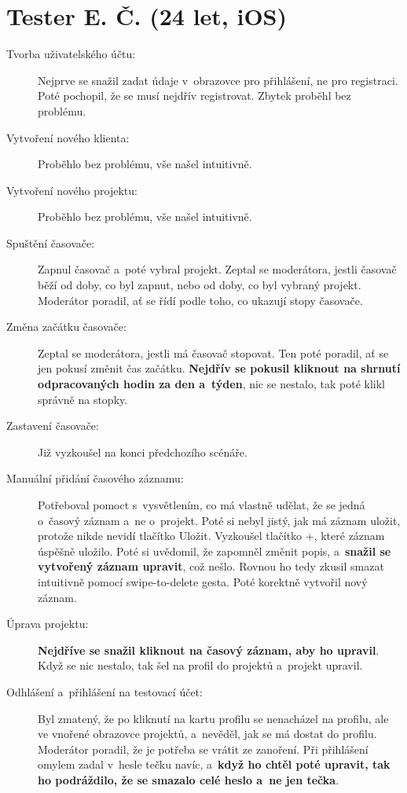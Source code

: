 \section*{Tester E. Č. (24 let, iOS)}

\begin{description}
\item[Tvorba uživatelského účtu:] Nejprve se snažil zadat údaje v~obrazovce pro přihlášení, ne pro registraci. Poté pochopil, že se musí nejdřív registrovat. Zbytek proběhl bez problému.
\item[Vytvoření nového klienta:] Proběhlo bez problému, vše našel intuitivně.
\item[Vytvoření nového projektu:] Proběhlo bez problému, vše našel intuitivně.
\item[Spuštění časovače:] Zapnul časovač a~poté vybral projekt. Zeptal se moderátora, jestli časovač běží od doby, co byl zapnut, nebo od doby, co byl vybraný projekt. Moderátor poradil, ať se řídí podle toho, co ukazují stopy časovače.
\item[Změna začátku časovače:] Zeptal se moderátora, jestli má časovač stopovat. Ten poté poradil, ať se jen pokusí změnit čas začátku. \textbf{Nejdřív se pokusil kliknout na shrnutí odpracovaných hodin za den a~týden}, nic se nestalo, tak poté klikl správně na stopky.
\item[Zastavení časovače:] Již vyzkoušel na konci předchozího scénáře.
\item[Manuální přidání časového záznamu:] Potřeboval pomoct s~vysvětlením, co má vlastně udělat, že se jedná o~časový záznam a~ne o~projekt. Poté si nebyl jistý, jak má záznam uložit, protože nikde nevidí tlačítko Uložit. Vyzkoušel tlačítko +, které záznam úspěšně uložilo. Poté si uvědomil, že zapomněl změnit popis, a~\textbf{snažil se vytvořený záznam upravit}, což nešlo. Rovnou ho tedy zkusil smazat intuitivně pomocí swipe-to-delete gesta. Poté korektně vytvořil nový záznam.
\item[Úprava projektu:] \textbf{Nejdříve se snažil kliknout na časový záznam, aby ho upravil}. Když se nic nestalo, tak šel na profil do projektů a~projekt upravil.
\item[Odhlášení a~přihlášení na testovací účet:] Byl zmatený, že po kliknutí na kartu profilu se nenacházel na profilu, ale ve vnořené obrazovce projektů, a~nevěděl, jak se má dostat do profilu. Moderátor poradil, že je potřeba se vrátit ze zanoření. Při přihlášení omylem zadal v~hesle tečku navíc, a~\textbf{když ho chtěl poté upravit, tak ho podráždilo, že se smazalo celé heslo a~ne jen tečka}.

\end{description}
